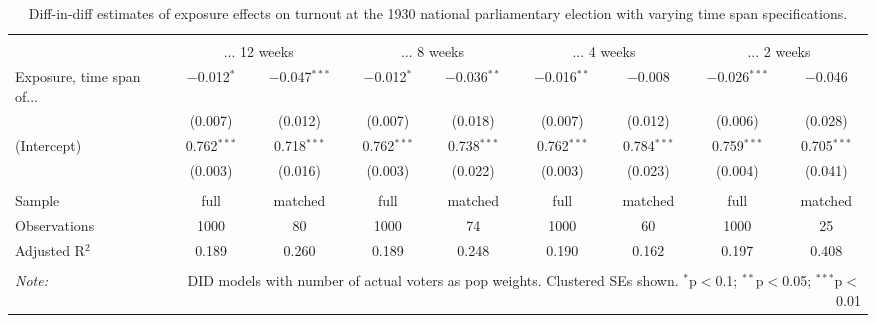 
\begin{table}[!htbp] \centering 
  \caption{Diff-in-diff estimates of exposure effects on turnout at the 1930 national parliamentary election with varying time span specifications.\vspace{-.25cm}} 
  \label{tab:nsdap-turnout-timespan-dd-1930} 
\scriptsize 
\begin{tabular}{@{\extracolsep{5pt}}lcccccccc} 
\\[-1.8ex]\hline 
\hline \\[-1.8ex] 
 & \multicolumn{2}{c}{... 12 weeks} & \multicolumn{2}{c}{... 8 weeks} & \multicolumn{2}{c}{... 4 weeks} & \multicolumn{2}{c}{... 2 weeks} \\ 
 \cmidrule(r){2-3}\cmidrule(r){4-5}\cmidrule(r){6-7}\cmidrule(r){8-9}Exposure, time span of... & $-$0.012$^{*}$ & $-$0.047$^{***}$ & $-$0.012$^{*}$ & $-$0.036$^{**}$ & $-$0.016$^{**}$ & $-$0.008 & $-$0.026$^{***}$ & $-$0.046 \\ 
  & (0.007) & (0.012) & (0.007) & (0.018) & (0.007) & (0.012) & (0.006) & (0.028) \\ 
  (Intercept) & 0.762$^{***}$ & 0.718$^{***}$ & 0.762$^{***}$ & 0.738$^{***}$ & 0.762$^{***}$ & 0.784$^{***}$ & 0.759$^{***}$ & 0.705$^{***}$ \\ 
  & (0.003) & (0.016) & (0.003) & (0.022) & (0.003) & (0.023) & (0.004) & (0.041) \\ 
 \hline \\[-1.8ex] 
Sample & full & matched & full & matched & full & matched & full & matched \\ 
Observations & 1000 & 80 & 1000 & 74 & 1000 & 60 & 1000 & 25 \\ 
Adjusted R$^{2}$ & 0.189 & 0.260 & 0.189 & 0.248 & 0.190 & 0.162 & 0.197 & 0.408 \\ 
\hline 
\hline \\[-1.8ex] 
\textit{Note:}  & \multicolumn{8}{r}{DID models with number of actual voters as pop weights. Clustered SEs shown. $^{*}$p$<$0.1; $^{**}$p$<$0.05; $^{***}$p$<$0.01} \\ 
\end{tabular} 
\end{table} 
